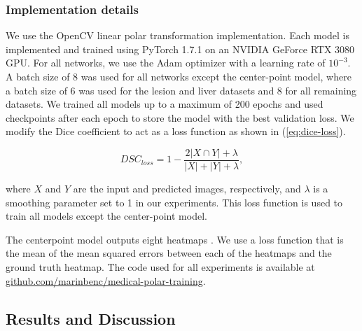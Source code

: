     \subsubsection{Implementation details}

We use the OpenCV linear polar transformation implementation.
Each model is implemented and trained using PyTorch 1.7.1 on an NVIDIA GeForce RTX 3080 GPU. For all 
networks, we use the Adam optimizer with a learning rate of $10^{-3}$. A batch size of 8 was used for all 
networks except the center-point model, where a batch size of 6 was used for the lesion and liver datasets 
and 8 for all remaining datasets. We trained all models up to a maximum of 200 epochs and used checkpoints 
after each epoch to store the model with the best validation loss. We modify the Dice coefficient to act as a loss function as shown in (\ref{eq:dice-loss}).

  \begin{equation}
    \textit{DSC}_{loss} = 1 - \frac {2\lvert X\cap Y\rvert + \lambda}{\lvert X\rvert + \lvert Y\rvert + \lambda},
    \label{eq:dice-loss}
  \end{equation}
  
where $X$ and $Y$ are the input and predicted images, respectively, and $\lambda$ is a smoothing parameter set to 1 in our experiments. 
This loss function is used to train all models except the center-point model.

The centerpoint model outputs eight heatmaps \cite{newellStackedHourglassNetworks2016}. 
We use a loss function that is the mean of the mean squared errors between each of the heatmaps and the ground truth heatmap.
The code used for all experiments is available at \url{github.com/marinbenc/medical-polar-training}.

  \subsection{Results and Discussion}



